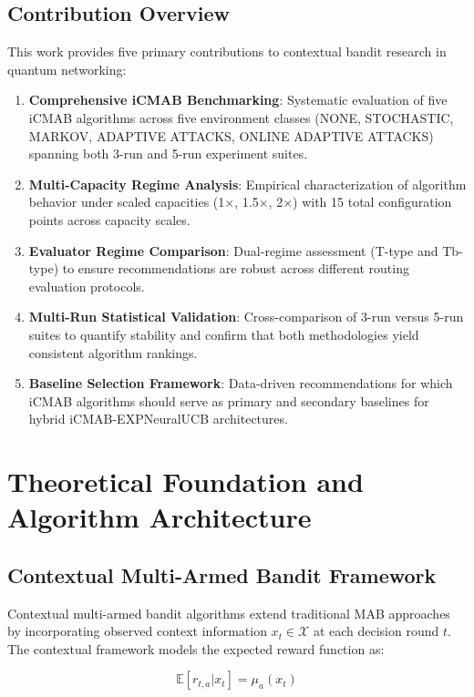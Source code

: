 \documentclass[12pt,a4paper]{article}
\begin{document}
\subsection{Contribution Overview}

This work provides five primary contributions to contextual bandit research in quantum networking:

\begin{enumerate}
\item \textbf{Comprehensive iCMAB Benchmarking}: Systematic evaluation of five iCMAB algorithms across five environment classes (NONE, STOCHASTIC, MARKOV, ADAPTIVE ATTACKS, ONLINE ADAPTIVE ATTACKS) spanning both 3-run and 5-run experiment suites.
\item \textbf{Multi-Capacity Regime Analysis}: Empirical characterization of algorithm behavior under scaled capacities (1$\times$, 1.5$\times$, 2$\times$) with 15 total configuration points across capacity scales.
\item \textbf{Evaluator Regime Comparison}: Dual-regime assessment (T-type and Tb-type) to ensure recommendations are robust across different routing evaluation protocols.
\item \textbf{Multi-Run Statistical Validation}: Cross-comparison of 3-run versus 5-run suites to quantify stability and confirm that both methodologies yield consistent algorithm rankings.
\item \textbf{Baseline Selection Framework}: Data-driven recommendations for which iCMAB algorithms should serve as primary and secondary baselines for hybrid iCMAB-EXPNeuralUCB architectures.
\end{enumerate}

\newpage
\section{Theoretical Foundation and Algorithm Architecture}

\subsection{Contextual Multi-Armed Bandit Framework}

Contextual multi-armed bandit algorithms extend traditional MAB approaches by incorporating observed context information $x_t \in \mathcal{X}$ at each decision round $t$. The contextual framework models the expected reward function as:

\begin{equation}
\mathbb{E}[r_{t,a} | x_t] = \mu_a(x_t)
\end{equation}
\end{document}
